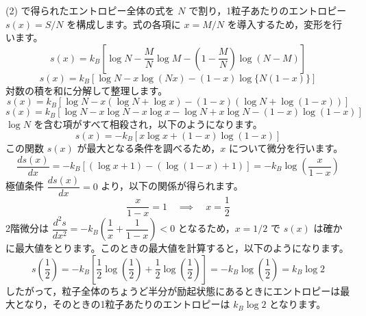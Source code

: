 \begin{solutionparts}
(2) で得られたエントロピー全体の式を $N$ で割り，1粒子あたりのエントロピー $s(x) = S/N$ を構成します。式の各項に $x = M/N$ を導入するため，変形を行います。
\begin{equation*}
s(x) = k_B \left[ \log N - \frac{M}{N} \log M - \left( 1 - \frac{M}{N} \right) \log (N-M) \right]
\end{equation*}
\begin{equation*}
s(x) = k_B \left[ \log N - x \log (Nx) - (1-x) \log \{N(1-x)\} \right]
\end{equation*}
対数の積を和に分解して整理します。
\begin{equation*}
s(x) = k_B \left[ \log N - x (\log N + \log x) - (1-x) (\log N + \log (1-x)) \right]
\end{equation*}
\begin{equation*}
s(x) = k_B \left[ \log N - x \log N - x \log x - \log N + x \log N - (1-x) \log (1-x) \right]
\end{equation*}
$\log N$ を含む項がすべて相殺され，以下のようになります。
\begin{equation*}
s(x) = -k_B \left[ x \log x + (1-x) \log (1-x) \right]
\end{equation*}
この関数 $s(x)$ が最大となる条件を調べるため，$x$ について微分を行います。
\begin{equation*}
\frac{ds(x)}{dx} = -k_B \left[ (\log x + 1) - (\log (1-x) + 1) \right] = -k_B \log \left( \frac{x}{1-x} \right)
\end{equation*}
極値条件 $\dfrac{ds(x)}{dx} = 0$ より，以下の関係が得られます。
\begin{equation*}
\frac{x}{1-x} = 1 \quad \implies \quad x = \frac{1}{2}
\end{equation*}
2階微分は $\dfrac{d^2s}{dx^2} = -k_B \left( \dfrac{1}{x} + \dfrac{1}{1-x} \right) < 0$ となるため，$x = 1/2$ で $s(x)$ は確かに最大値をとります。このときの最大値を計算すると，以下のようになります。
\begin{equation*}
s\left(\frac{1}{2}\right) = -k_B \left[ \frac{1}{2} \log \left(\frac{1}{2}\right) + \frac{1}{2} \log \left(\frac{1}{2}\right) \right] = -k_B \log \left(\frac{1}{2}\right) = k_B \log 2
\end{equation*}
したがって，粒子全体のちょうど半分が励起状態にあるときにエントロピーは最大となり，そのときの1粒子あたりのエントロピーは $k_B \log 2$ となります。

\end{solutionparts}
